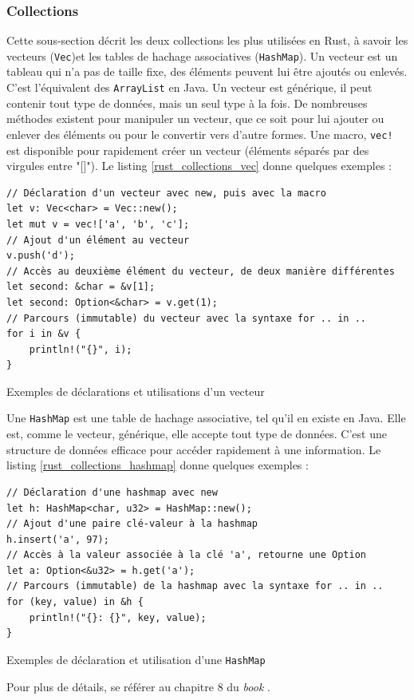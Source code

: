\documentclass[a4paper, 12pt]{article}
\newenvironment{code}{\captionsetup{type=listing}}{}
\begin{document}
\subsubsection{Collections}\label{rust_collections}
Cette sous-section décrit les deux collections les plus utilisées en Rust, à savoir les vecteurs 
(\texttt{Vec})et les tables de 
hachage associatives (\texttt{HashMap}). Un vecteur est un tableau qui n'a pas de taille 
fixe, des éléments peuvent lui être ajoutés ou enlevés. C'est l'équivalent des \texttt{ArrayList} 
en Java. Un vecteur est générique, il peut contenir tout type de données, mais un seul type à la fois. 
De nombreuses méthodes existent pour manipuler un vecteur, que ce soit pour lui ajouter ou enlever 
des éléments ou pour le convertir vers d'autre formes. Une macro, \texttt{vec!} est 
disponible pour rapidement créer un vecteur (éléments séparés par des virgules entre "[]").
Le listing \ref{rust_collections_vec} donne quelques exemples :
\bigbreak
\begin{code}
    \begin{verbatim}
// Déclaration d'un vecteur avec new, puis avec la macro
let v: Vec<char> = Vec::new();
let mut v = vec!['a', 'b', 'c'];
// Ajout d'un élément au vecteur
v.push('d');
// Accès au deuxième élément du vecteur, de deux manière différentes
let second: &char = &v[1];
let second: Option<&char> = v.get(1);
// Parcours (immutable) du vecteur avec la syntaxe for .. in ..
for i in &v {
    println!("{}", i);
}
    \end{verbatim}
    \caption{Exemples de déclarations et utilisations d'un vecteur}
    \label{rust_collections_vec}
\end{code}
\bigbreak
Une \texttt{HashMap} est une table de hachage associative, tel qu'il en existe en Java.
Elle est, comme le vecteur, générique, elle accepte tout type de données. C'est une structure de 
données efficace pour accéder rapidement à une information.
Le listing \ref{rust_collections_hashmap} donne quelques exemples :
\bigbreak
\begin{code}
    \begin{verbatim}
// Déclaration d'une hashmap avec new
let h: HashMap<char, u32> = HashMap::new();
// Ajout d'une paire clé-valeur à la hashmap
h.insert('a', 97);
// Accès à la valeur associée à la clé 'a', retourne une Option
let a: Option<&u32> = h.get('a');
// Parcours (immutable) de la hashmap avec la syntaxe for .. in ..
for (key, value) in &h {
    println!("{}: {}", key, value);
}
    \end{verbatim}
    \caption{Exemples de déclaration et utilisation d'une \texttt{HashMap}}
    \label{rust_collections_hashmap}
\end{code}
\bigbreak
Pour plus de détails, se référer au chapitre 8 du \textit{book} \cite{ref0}.
\end{document}
